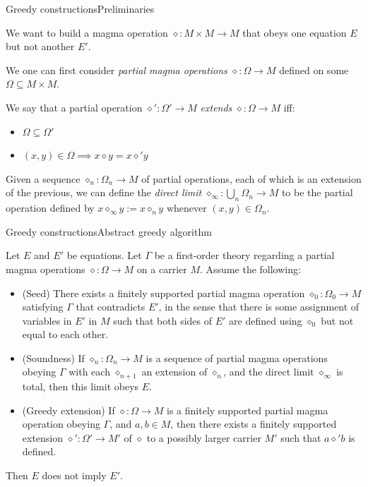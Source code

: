 \documentclass{beamer}
\newcommand{\op}{\diamond}
\begin{document}
\begin{frame}{Greedy constructions}{Preliminaries}

We want to build a magma operation $\op \colon M \times M \to M$ that obeys one equation $E$ but not another $E'$.

We one can first consider \emph{partial magma operations} $\op \colon \Omega \to M$ defined on some  $\Omega \subseteq M \times M$.

We say that a partial operation $\op' \colon \Omega' \to M$ \emph{extends} $\op \colon \Omega \to M$ iff:\!
\begin{itemize}
	\item $\Omega \subseteq \Omega'$
	\item $(x, y) \in \Omega \implies x \op y = x \op' y$
\end{itemize}

Given a sequence $\op_n \colon \Omega_n \to M$ of partial operations, each of which is an extension of the previous, we can define the \emph{direct limit} $\op_\infty \colon \bigcup_n \Omega_n \to M$ to be the partial operation defined by $x \op_\infty y := x \op_n y$ whenever $(x,y) \in \Omega_n$.

\end{frame}


\begin{frame}{Greedy constructions}{Abstract greedy algorithm}
	
Let $E$ and $E'$ be equations.
Let $\Gamma$ be a first-order theory regarding a partial magma operations $\op \colon \Omega \to M$ on a carrier $M$.
Assume the following:
\begin{itemize}
	\item (Seed) There exists a finitely supported partial magma operation $\op_0 \colon \Omega_0 \to M$ satisfying $\Gamma$ that contradicts $E'$, in the sense that there is some assignment of variables in $E'$ in $M$ such that both sides of $E'$ are defined using $\op_0$ but not equal to each other.
	\item (Soundness) If $\op_n \colon \Omega_n \to M$ is a sequence of partial magma operations obeying $\Gamma$ with each $\op_{n+1}$ an extension of $\op_n$, and the direct limit $\op_\infty$ is total, then this limit obeys $E$.
	\item (Greedy extension) If $\op \colon \Omega \to M$ is a finitely supported partial magma operation obeying $\Gamma$, and $a,b \in M$, then there exists a finitely supported extension $\op' \colon \Omega' \to M'$ of $\op$ to a possibly larger carrier $M'$ such that $a \op' b$ is defined.
\end{itemize}
Then $E$ does not imply $E'$.
	
\end{frame}
\end{document}

